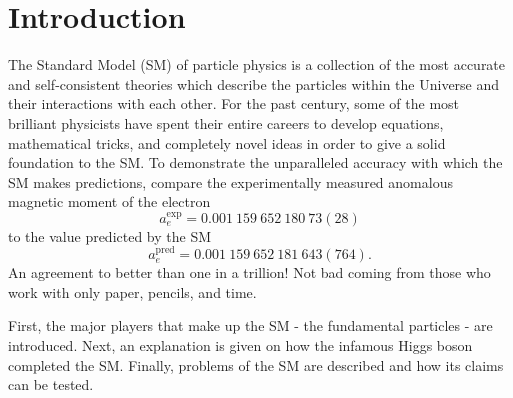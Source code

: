 \chapter{Introduction}


The Standard Model (SM) of particle physics is a collection of the most accurate and self-consistent theories which describe the particles within the Universe and their interactions with each other.
For the past century, some of the most brilliant physicists have spent their entire careers to develop equations, mathematical tricks, and completely novel ideas in order to give a solid foundation to the SM.
To demonstrate the unparalleled accuracy with which the SM makes predictions, compare the experimentally measured anomalous magnetic moment of the electron
\begin{equation*}
    a_e^{\mathrm{exp}} = 0.001\ 159\ 652\ 180\ 73(28)
\end{equation*}
to the value predicted by the SM
\begin{equation*}
    a_e^{\mathrm{pred}} = 0.001\ 159\ 652\ 181\ 643(764).
\end{equation*}
An agreement to better than one in a trillion! 
Not bad coming from those who work with only paper, pencils, and time.

First, the major players that make up the SM - the fundamental particles - are introduced.
Next, an explanation is given on how the infamous Higgs boson completed the SM.
Finally, problems of the SM are described and how its claims can be tested.


